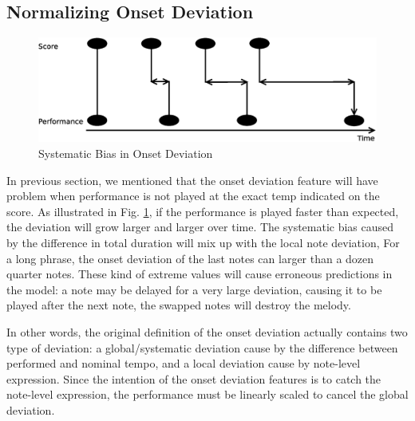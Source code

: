    \subsection{Normalizing Onset Deviation}
   \label{sec:normalize}
\begin{figure}[tp]
   \begin{center}
      \includegraphics[width=\textwidth]{fig/prob_onset_diff}

   \end{center}
   \caption{Systematic Bias in Onset Deviation }
   \label{fig:normalizationprob}
\end{figure}
%
In previous section, we mentioned that the onset deviation feature will have problem when performance is not played at the exact temp indicated on the score. As illustrated in Fig. \ref{fig:normalizationprob}, if the performance is played faster than expected, the deviation will grow larger and larger over time. The systematic bias caused by the difference in total duration will mix up with the local note deviation, For a long phrase, the onset deviation of the last notes can larger than a dozen quarter notes. These kind of extreme values will cause erroneous predictions in the model: a note may be delayed for a very large deviation, causing it to be played after the next note, the swapped notes will destroy the melody.
 
In other words, the original definition of the onset deviation actually contains two type of deviation: a global/systematic deviation cause by the difference between performed and nominal tempo, and a local deviation cause by note-level expression. Since the intention of the onset deviation features is to catch the note-level expression, the performance must be linearly scaled to cancel the global deviation.

